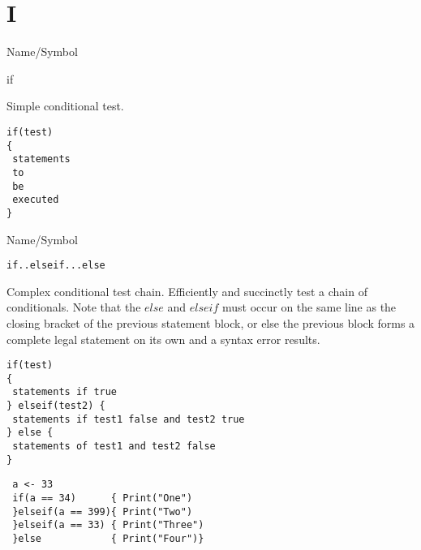\rl


\section{I}
\rl


\begin{desc}{Name/Symbol}
\item[Name/Symbol]	if 

\item[Description]	Simple conditional test.

\item[Usage]
\begin{verbatim}
if(test)
{
 statements
 to
 be 
 executed
}
\end{verbatim}

\item[Example]	

\item[See Also]	
\end{desc}

\rl




\begin{desc}{Name/Symbol}
\item[Name/Symbol]	\verb+if..elseif...else+            

\item[Description]	Complex conditional test chain.  Efficiently and
  succinctly test a chain of conditionals.  Note that the $else$ and
  $elseif$ must occur on the same line as the closing bracket of the 
  previous statement block, or else the previous block forms a
  complete legal statement on its own and a syntax error results.

\item[Usage]
\begin{verbatim}
if(test)
{
 statements if true
} elseif(test2) {
 statements if test1 false and test2 true
} else {
 statements of test1 and test2 false
}
\end{verbatim}


\item[Example]	
\begin{verbatim}
 a <- 33
 if(a == 34)      { Print("One")
 }elseif(a == 399){ Print("Two")
 }elseif(a == 33) { Print("Three")
 }else            { Print("Four")}
\end{verbatim}

\item[See Also]	
\end{desc}

